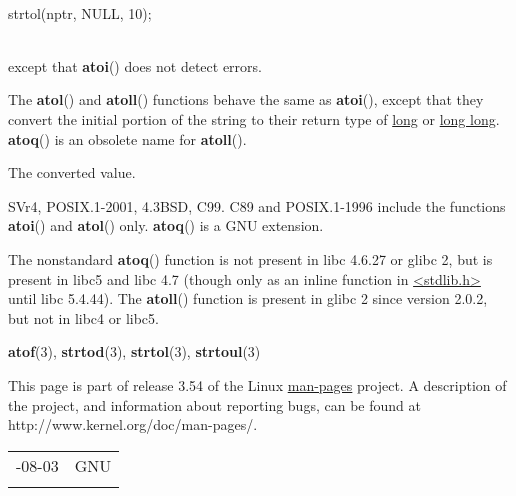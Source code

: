 \documentclass[]{article}
\let\realtextbf=\textbf
\renewcommand{\textbf}[1]{\textcolor{boldcolor}{\realtextbf{#1}}}
\renewcommand{\emph}[1]{\underline{#1}}
\begin{document}
~

strtol(nptr, NULL, 10); \\

~

except that \textbf{atoi}() does not detect errors.

The \textbf{atol}() and \textbf{atoll}() functions behave the same as
\textbf{atoi}(), except that they convert the initial portion of the
string to their return type of \emph{long} or \emph{long long}.
\textbf{atoq}() is an obsolete name for \textbf{atoll}().


The converted value.


SVr4, POSIX.1-2001, 4.3BSD, C99. C89 and POSIX.1-1996 include the
functions \textbf{atoi}() and \textbf{atol}() only. \textbf{atoq}() is a
GNU extension.


The nonstandard \textbf{atoq}() function is not present in libc 4.6.27
or glibc 2, but is present in libc5 and libc 4.7 (though only as an
inline function in \emph{\textless{}stdlib.h\textgreater{}} until libc
5.4.44). The \textbf{atoll}() function is present in glibc 2 since
version 2.0.2, but not in libc4 or libc5.


\textbf{atof}(3), \textbf{strtod}(3), \textbf{strtol}(3),
\textbf{strtoul}(3)


This page is part of release 3.54 of the Linux \emph{man-pages} project.
A description of the project, and information about reporting bugs, can
be found at http://www.kernel.org/doc/man-pages/.

\begin{longtable}[c]{@{}ll@{}}
\toprule\addlinespace
2012-08-03 & GNU
\\\addlinespace
\bottomrule
\end{longtable}
\end{document}
